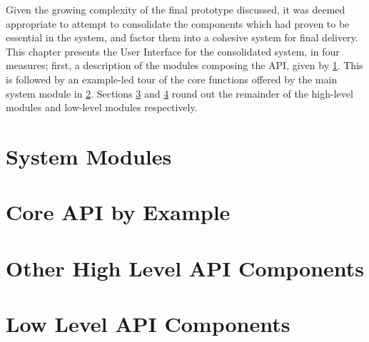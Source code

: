 Given the growing complexity of the final prototype discussed, it was deemed appropriate to attempt to consolidate the components which had proven to be essential in the system, and factor them into a cohesive system for final delivery.
This chapter presents the User Interface for the consolidated system, in four measures; first, a description of the modules composing the API, given by \cref{sec:sysmod}.
This is followed by an example-led tour of the core functions offered by the main system module in \cref{sec:api-example}.
Sections \cref{sec:api-high} and \cref{sec:api-low}  round out the remainder of the high-level modules and low-level modules respectively.

\section{System Modules}\label{sec:sysmod}

\section{Core API by Example}\label{sec:api-example}

\section{Other High Level API Components}\label{sec:api-high}

\section{Low Level API Components}\label{sec:api-low}

